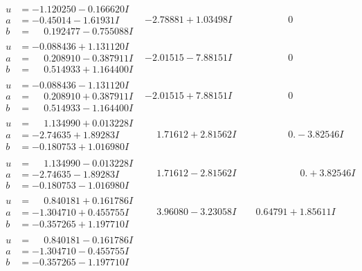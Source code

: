 \documentclass[1p]{elsarticle_modified}
\theoremstyle{definition}
\begin{document}
$$\begin{array}{c|c|c}
\begin{aligned}
u &= -1.120250 - 0.166620 I \\
a &= -0.45014 - 1.61931 I \\
b &= \phantom{-}0.192477 - 0.755088 I\end{aligned}
 & -2.78881 + 1.03498 I & \phantom{-0.000000 } 0 \\ \hline\begin{aligned}
u &= -0.088436 + 1.131120 I \\
a &= \phantom{-}0.208910 - 0.387911 I \\
b &= \phantom{-}0.514933 + 1.164400 I\end{aligned}
 & -2.01515 - 7.88151 I & \phantom{-0.000000 } 0 \\ \hline\begin{aligned}
u &= -0.088436 - 1.131120 I \\
a &= \phantom{-}0.208910 + 0.387911 I \\
b &= \phantom{-}0.514933 - 1.164400 I\end{aligned}
 & -2.01515 + 7.88151 I & \phantom{-0.000000 } 0 \\ \hline\begin{aligned}
u &= \phantom{-}1.134990 + 0.013228 I \\
a &= -2.74635 + 1.89283 I \\
b &= -0.180753 + 1.016980 I\end{aligned}
 & \phantom{-}1.71612 + 2.81562 I & \phantom{-0.000000 } 0. - 3.82546 I \\ \hline\begin{aligned}
u &= \phantom{-}1.134990 - 0.013228 I \\
a &= -2.74635 - 1.89283 I \\
b &= -0.180753 - 1.016980 I\end{aligned}
 & \phantom{-}1.71612 - 2.81562 I & \phantom{-0.000000 -}0. + 3.82546 I \\ \hline\begin{aligned}
u &= \phantom{-}0.840181 + 0.161786 I \\
a &= -1.304710 + 0.455755 I \\
b &= -0.357265 + 1.197710 I\end{aligned}
 & \phantom{-}3.96080 - 3.23058 I & \phantom{-}0.64791 + 1.85611 I \\ \hline\begin{aligned}
u &= \phantom{-}0.840181 - 0.161786 I \\
a &= -1.304710 - 0.455755 I \\
b &= -0.357265 - 1.197710 I\end{aligned}

\end{array}$$
\end{document}
